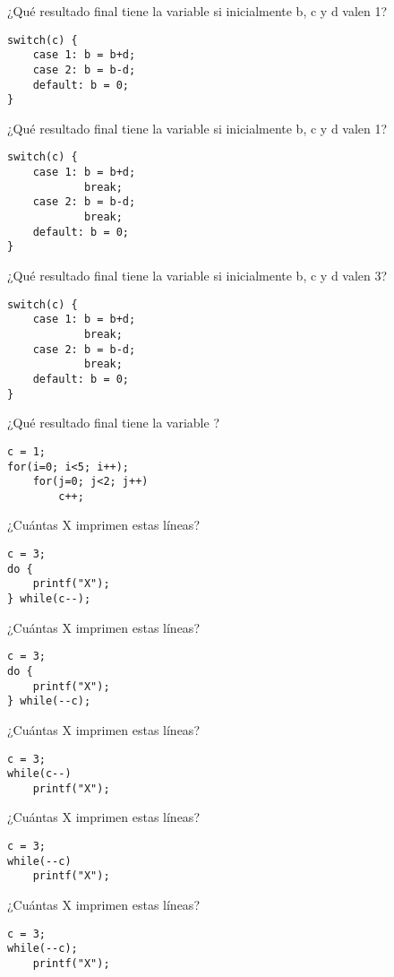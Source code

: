 \begin{preguntas}
\question ¿Qué resultado final tiene la variable  si inicialmente b, c y d valen 1?
\begin{lstlisting}
switch(c) {
	case 1: b = b+d;
	case 2: b = b-d;
	default: b = 0;
}
\end{lstlisting}

\question ¿Qué resultado final tiene la variable  si inicialmente b, c y d valen 1?
\begin{lstlisting}
switch(c) {
	case 1: b = b+d;
			break;
	case 2: b = b-d;
			break;
	default: b = 0;
}
\end{lstlisting}

\question ¿Qué resultado final tiene la variable  si inicialmente b, c y d valen 3?
\begin{lstlisting}
switch(c) {
	case 1: b = b+d;
			break;
	case 2: b = b-d;
			break;
	default: b = 0;
}
\end{lstlisting}

\question ¿Qué resultado final tiene la variable ?
\begin{lstlisting}
c = 1;
for(i=0; i<5; i++);
	for(j=0; j<2; j++)    
		c++;
\end{lstlisting}

\question ¿Cuántas X imprimen estas líneas?
\begin{lstlisting}
c = 3; 
do {
	printf("X");
} while(c--);
\end{lstlisting}

\question ¿Cuántas X imprimen estas líneas?
\begin{lstlisting}
c = 3; 
do { 
	printf("X"); 
} while(--c);
\end{lstlisting}

\question ¿Cuántas X imprimen estas líneas?
\begin{lstlisting}
c = 3; 
while(c--) 
	printf("X"); 
\end{lstlisting}

\question ¿Cuántas X imprimen estas líneas?
\begin{lstlisting}
c = 3; 
while(--c) 
	printf("X");
\end{lstlisting}

\question ¿Cuántas X imprimen estas líneas?
\begin{lstlisting}
c = 3; 
while(--c); 
	printf("X");
\end{lstlisting}
\end{preguntas}
